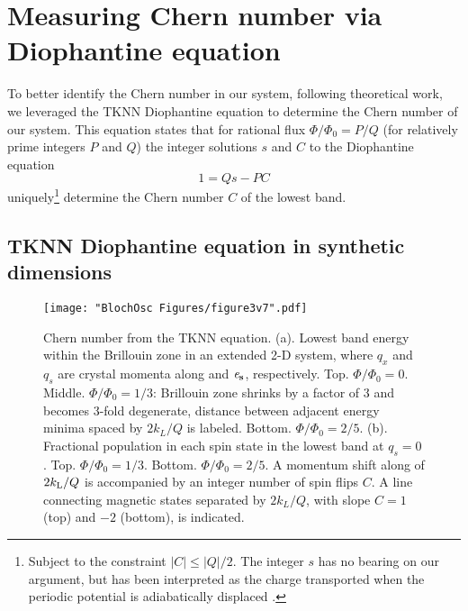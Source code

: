 \section{Measuring Chern number via Diophantine equation}
To better identify the Chern number in our system, following theoretical work\cite{Huang2013,Liu2013,Wang2013,Zhang2016,Mugel2017}, we leveraged the TKNN Diophantine equation to determine the Chern number of our system. This equation states that for rational flux $\Phi/\Phi_0 = P/Q$ (for relatively prime integers $P$ and $Q$) the integer solutions  $s$ and $C$ to the Diophantine equation
\begin{equation}
1 = Q s - P C
\label{eqn:Diophantine}
\end{equation}  
uniquely\footnote{Subject to the constraint $|C|\leq |Q|/2$\cite{Thouless1982, Kohmoto1989}. The integer $s$ has no bearing on our argument, but has been interpreted as the charge transported when the periodic potential is adiabatically displaced \cite{MacDonald1984,Kunz1986}.} determine the Chern number $C$ of the lowest band.

\subsection{TKNN Diophantine equation in synthetic dimensions}

\begin{figure}
\texttt{[image: "BlochOsc Figures/figure3v7".pdf]}
\caption[Chern number from the TKNN equation ]{Chern number from the TKNN equation. (a). Lowest band energy within the Brillouin zone in an extended 2-D system, where $q_x$ and $q_s$ are crystal momenta along \ex and $\bf{\mathit{e}_s}$, respectively. Top. $\Phi/\Phi_0=0$. Middle. $\Phi/\Phi_0=1/3$: Brillouin zone shrinks by a factor of $3$ and becomes 3-fold degenerate, distance between adjacent energy minima spaced by $2k_L/Q$ is labeled. Bottom. $\Phi/\Phi_0=2/5$. (b).  Fractional population in each spin state in the lowest band at $q_s=0$. Top. $\Phi/\Phi_0=1/3$. Bottom. $\Phi/\Phi_0=2/5$. A momentum shift along \ex of $2k_{\rm{L}}/Q$ is accompanied by an integer number of spin flips $C$. A line connecting magnetic states separated by $2k_L/Q$, with slope $C=1$ (top) and $-2$ (bottom), is indicated. }
\label{fig:Diophantine}
\end{figure}

